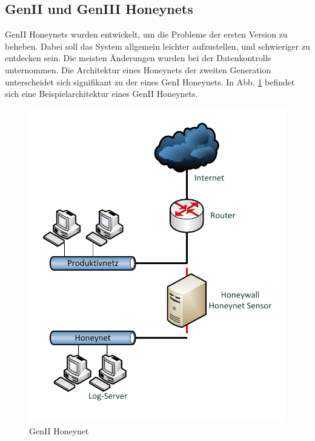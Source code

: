 \subsection{GenII und GenIII Honeynets}
GenII Honeynets wurden entwickelt, um die Probleme der ersten Version zu beheben. Dabei soll das System allgemein leichter aufzustellen, und schwieriger zu entdecken sein. Die meisten Änderungen wurden bei der Datenkontrolle unternommen. Die Architektur eines Honeynets der zweiten Generation unterscheidet sich signifikant zu der eines GenI Honeynets. In Abb. \ref{hnet:genii} befindet sich eine Beispielarchitektur eines GenII Honeynets\cite{spitzner.2002a}\cite{WebGenII.2006b}.\\

\begin{figure}[h]
    \centering\includegraphics[scale=0.5]{Bilder/GenII.pdf}
  \caption{GenII Honeynet}
  \label{hnet:genii}
\end{figure}

